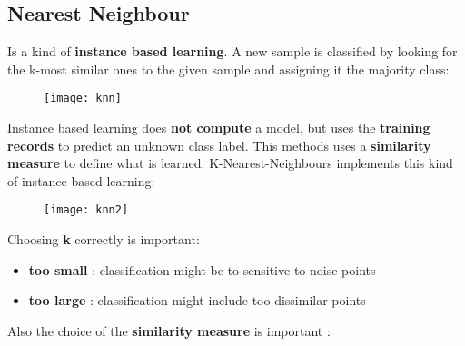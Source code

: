 \subsection{Nearest Neighbour}
Is a kind of \textbf{instance based learning}. A new sample is classified by looking for the k-most similar ones to the given sample and assigning it the majority class: 
\begin{figure}[H]
  \centering
  \texttt{[image: knn]}
\end{figure}
Instance based learning does \textbf{not compute} a model, but uses the \textbf{training records} to predict an unknown class label. This methods uses a  \textbf{similarity measure} to define what is learned. K-Nearest-Neighbours implements this kind of instance based learning:
\begin{figure}[H]
  \centering
  \texttt{[image: knn2]}
\end{figure}
Choosing \textbf{k} correctly is important:
\begin{itemize}
\item \textbf{too small} : classification might be to sensitive to noise points
\item \textbf{too large} : classification might include too dissimilar points
\end{itemize}
Also the choice of the \textbf{similarity measure} is important :
